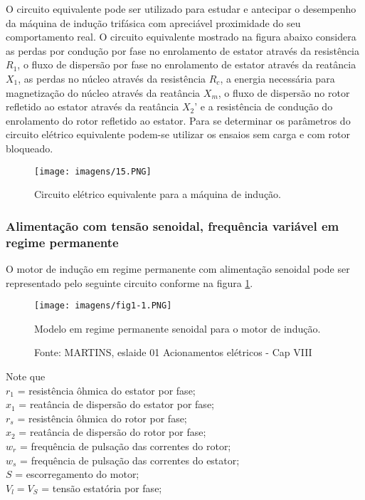 O circuito equivalente pode ser utilizado para estudar e antecipar o desempenho da máquina de indução trifásica com apreciável proximidade do seu comportamento real. O circuito equivalente mostrado na figura abaixo considera as perdas por condução por fase no enrolamento de estator através  da resistência $R_1$, o fluxo de dispersão por fase no enrolamento de estator através da reatância $X_1$, as perdas no núcleo através da resistência $R_c$, a energia necessária para magnetização do núcleo através da reatância $X_m$, o fluxo de dispersão no rotor refletido ao estator através da reatância $X_2$’ e a resistência de condução do enrolamento do rotor refletido ao estator. Para se determinar os parâmetros do circuito elétrico equivalente podem-se utilizar os ensaios sem carga e com rotor bloqueado.

\begin{figure}[ht!]
\center 
\texttt{[image: imagens/15.PNG]}
\caption{Circuito elétrico equivalente para a máquina de indução.}
\end{figure}


\subsubsection{Alimentação com tensão senoidal, frequência variável em regime permanente}
O motor de indução em regime permanente com alimentação senoidal pode ser representado pelo seguinte circuito conforme na figura \ref{fig:fig1-1}.

\begin{figure}[ht!]
\center
\texttt{[image: imagens/fig1-1.PNG]}
\caption{\label{fig:fig1-1}Modelo em regime permanente senoidal para o motor de indução.}
\caption*{Fonte: MARTINS, eslaide 01 Acionamentos elétricos - Cap VIII}
\end{figure}

Note que\\

$r_{1}$ = resistência ôhmica do estator por fase;\\
$x_{1}$ = reatância de dispersão do estator por fase;\\
$r_{s}$ = resistência ôhmica do rotor por fase;\\
$x_{2}$ = reatância de dispersão do rotor por fase;\\
$w_{r}$ = frequência de pulsação das correntes do rotor;\\
$w_{s}$ = frequência de pulsação das correntes do estator;\\
$S$ = escorregamento do motor;\\
$V_{l} = V_{S}$ = tensão estatória por fase;\\

